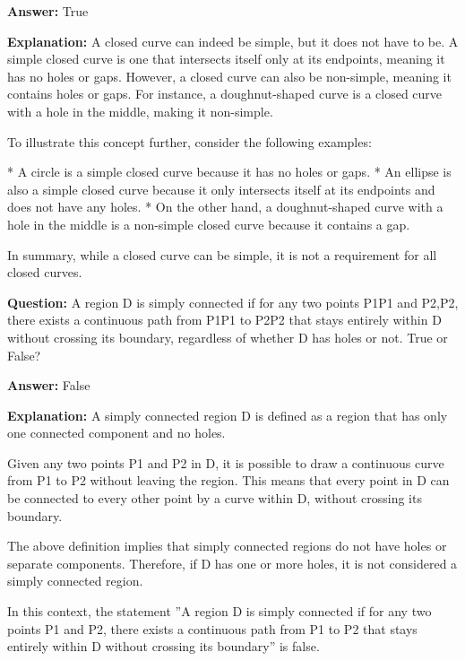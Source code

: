\documentclass{article}
\begin{document}
                \textbf{Answer:} True

                \textbf{Explanation:} A closed curve can indeed be simple, but it does not have to be. A simple closed curve is one that intersects itself only at its endpoints, meaning it has no holes or gaps. However, a closed curve can also be non-simple, meaning it contains holes or gaps. For instance, a doughnut-shaped curve is a closed curve with a hole in the middle, making it non-simple.

To illustrate this concept further, consider the following examples:

* A circle is a simple closed curve because it has no holes or gaps.
* An ellipse is also a simple closed curve because it only intersects itself at its endpoints and does not have any holes.
* On the other hand, a doughnut-shaped curve with a hole in the middle is a non-simple closed curve because it contains a gap.

In summary, while a closed curve can be simple, it is not a requirement for all closed curves.
                
                \vspace{0.5cm} 
        
            
                \textbf {Question:} A region D is simply connected if for any two points P1P1 and P2,P2, there exists a continuous path from P1P1 to P2P2 that stays entirely within D without crossing its boundary, regardless of whether D has holes or not. True or False?
                
                \textbf{Answer:} False

                \textbf{Explanation:} A simply connected region D is defined as a region that has only one connected component and no holes.

Given any two points P1 and P2 in D, it is possible to draw a continuous curve from P1 to P2 without leaving the region. This means that every point in D can be connected to every other point by a curve within D, without crossing its boundary.

The above definition implies that simply connected regions do not have holes or separate components. Therefore, if D has one or more holes, it is not considered a simply connected region.

In this context, the statement ''A region D is simply connected if for any two points P1 and P2, there exists a continuous path from P1 to P2 that stays entirely within D without crossing its boundary'' is false.
                
\end{document}
